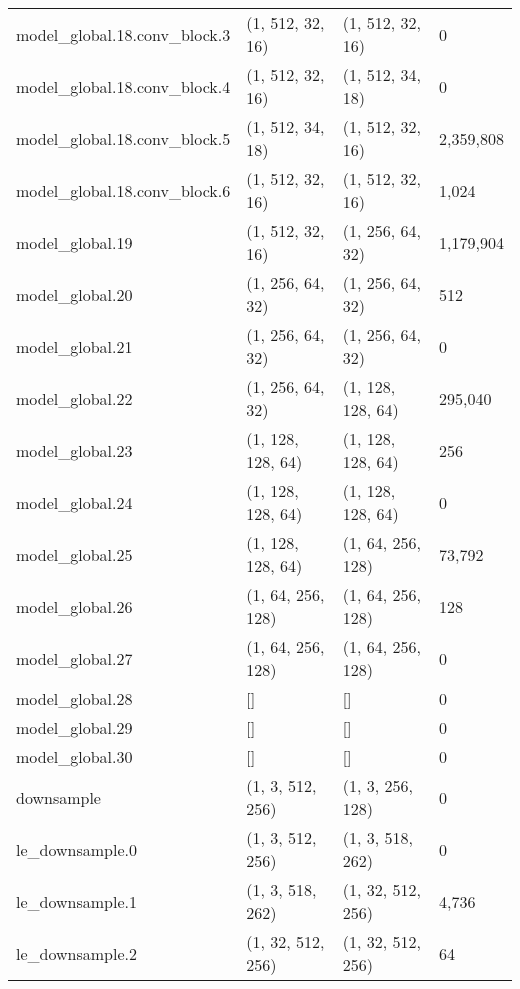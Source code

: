 \begin{longtable}{llll}
        model\_global.18.conv\_block.3 &   (1, 512, 32, 16) &   (1, 512, 32, 16) &           0 \\
        model\_global.18.conv\_block.4 &   (1, 512, 32, 16) &   (1, 512, 34, 18) &           0 \\
        model\_global.18.conv\_block.5 &   (1, 512, 34, 18) &   (1, 512, 32, 16) &   2,359,808 \\
        model\_global.18.conv\_block.6 &   (1, 512, 32, 16) &   (1, 512, 32, 16) &       1,024 \\
                    model\_global.19 &   (1, 512, 32, 16) &   (1, 256, 64, 32) &   1,179,904 \\
                    model\_global.20 &   (1, 256, 64, 32) &   (1, 256, 64, 32) &         512 \\
                    model\_global.21 &   (1, 256, 64, 32) &   (1, 256, 64, 32) &           0 \\
                    model\_global.22 &   (1, 256, 64, 32) &  (1, 128, 128, 64) &     295,040 \\
                    model\_global.23 &  (1, 128, 128, 64) &  (1, 128, 128, 64) &         256 \\
                    model\_global.24 &  (1, 128, 128, 64) &  (1, 128, 128, 64) &           0 \\
                    model\_global.25 &  (1, 128, 128, 64) &  (1, 64, 256, 128) &      73,792 \\
                    model\_global.26 &  (1, 64, 256, 128) &  (1, 64, 256, 128) &         128 \\
                    model\_global.27 &  (1, 64, 256, 128) &  (1, 64, 256, 128) &           0 \\
                    model\_global.28 &                 [] &                 [] &           0 \\
                    model\_global.29 &                 [] &                 [] &           0 \\
                    model\_global.30 &                 [] &                 [] &           0 \\
                        downsample &   (1, 3, 512, 256) &   (1, 3, 256, 128) &           0 \\
                    le\_downsample.0 &   (1, 3, 512, 256) &   (1, 3, 518, 262) &           0 \\
                    le\_downsample.1 &   (1, 3, 518, 262) &  (1, 32, 512, 256) &       4,736 \\
                    le\_downsample.2 &  (1, 32, 512, 256) &  (1, 32, 512, 256) &          64 \\

\end{longtable}
